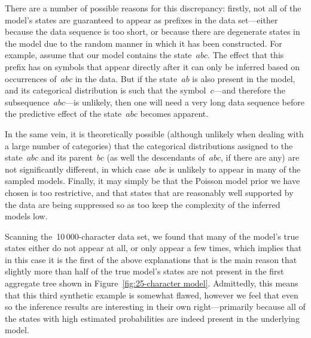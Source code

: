 \documentclass[11pt,a4paper]{article}
\begin{document}
There are a number of possible reasons for this discrepancy: firstly, not all of
the model's states are guaranteed to appear as prefixes in the data set---either
because the data sequence is too short, or because there are degenerate states
in the model due to the random manner in which it has been constructed. For
example, assume that our model contains the state~\(abc\). The effect that this
prefix has on symbols that appear directly after it can only be inferred based
on occurrences of~\(abc\) in the data. But if the state~\(ab\) is also present
in the model, and its categorical distribution is such that the
symbol~\(c\)---and therefore the subsequence~\(abc\)---is unlikely, then one
will need a very long data sequence before the predictive effect of the
state~\(abc\) becomes apparent.

In the same vein, it is theoretically possible (although unlikely when dealing
with a large number of categories) that the categorical distributions assigned
to the state~\(abc\) and its parent~\(bc\) (as well the descendants of~\(abc\),
if there are any) are not significantly different, in which case~\(abc\) is
unlikely to appear in many of the sampled models. Finally, it may simply be that
the Poisson model prior we have chosen is too restrictive, and that states that
are reasonably well supported by the data are being suppressed so as too keep
the complexity of the inferred models low.

Scanning the~10\,000-character data set, we found that many of the model's true
states either do not appear at all, or only appear a few times, which implies
that in this case it is the first of the above explanations that is the main
reason that slightly more than half of the true model's states are not present
in the first aggregate tree shown in Figure~\ref{fig:25-character model}.
Admittedly, this means that this third synthetic example is somewhat flawed,
however we feel that even so the inference results are interesting in their own
right---primarily because all of the states with high estimated probabilities
are indeed present in the underlying model.
\end{document}

